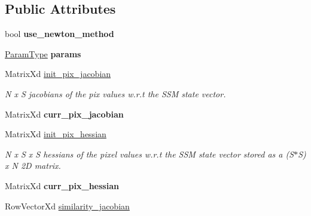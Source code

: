 \subsection*{Public Attributes}
\begin{DoxyCompactItemize}
\item 
\hypertarget{classHACLK_ac8db1e67d533f067fa907f62d092371a}{bool {\bfseries use\-\_\-newton\-\_\-method}}\label{classHACLK_ac8db1e67d533f067fa907f62d092371a}

\item 
\hypertarget{classHACLK_ab2d257d242d7ed7fc99ab0f67636fe62}{\hyperlink{structHACLKParams}{Param\-Type} {\bfseries params}}\label{classHACLK_ab2d257d242d7ed7fc99ab0f67636fe62}

\item 
\hypertarget{classHACLK_af4af6fad4891e79604874024c219afd6}{Matrix\-Xd \hyperlink{classHACLK_af4af6fad4891e79604874024c219afd6}{init\-\_\-pix\-\_\-jacobian}}\label{classHACLK_af4af6fad4891e79604874024c219afd6}

\begin{DoxyCompactList}\small\item\em N x S jacobians of the pix values w.\-r.\-t the S\-S\-M state vector. \end{DoxyCompactList}\item 
\hypertarget{classHACLK_af9a83d6bd6f0c9a28e1fa55566467f52}{Matrix\-Xd {\bfseries curr\-\_\-pix\-\_\-jacobian}}\label{classHACLK_af9a83d6bd6f0c9a28e1fa55566467f52}

\item 
\hypertarget{classHACLK_a6375da2cc74b787e142e5940c6691b68}{Matrix\-Xd \hyperlink{classHACLK_a6375da2cc74b787e142e5940c6691b68}{init\-\_\-pix\-\_\-hessian}}\label{classHACLK_a6375da2cc74b787e142e5940c6691b68}

\begin{DoxyCompactList}\small\item\em N x S x S hessians of the pixel values w.\-r.\-t the S\-S\-M state vector stored as a (S$\ast$\-S) x N 2\-D matrix. \end{DoxyCompactList}\item 
\hypertarget{classHACLK_a2e41b2138751bcb648148e68a6accabd}{Matrix\-Xd {\bfseries curr\-\_\-pix\-\_\-hessian}}\label{classHACLK_a2e41b2138751bcb648148e68a6accabd}

\item 
\hypertarget{classHACLK_a12cd9ed711a94382d6ae8fb04c7c7555}{Row\-Vector\-Xd \hyperlink{classHACLK_a12cd9ed711a94382d6ae8fb04c7c7555}{similarity\-\_\-jacobian}}\label{classHACLK_a12cd9ed711a94382d6ae8fb04c7c7555}


\end{DoxyCompactItemize}
